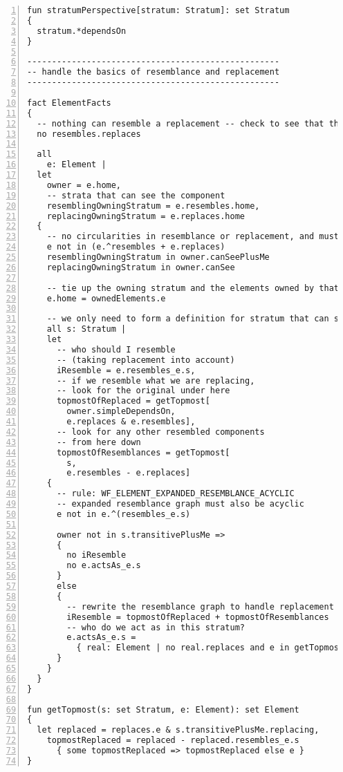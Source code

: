 \begin{lstlisting}[caption={base\_facts.als}, numbers=left]
fun stratumPerspective[stratum: Stratum]: set Stratum
{
  stratum.*dependsOn
}

---------------------------------------------------
-- handle the basics of resemblance and replacement
---------------------------------------------------

fact ElementFacts
{
  -- nothing can resemble a replacement -- check to see that the things we resemble don't replace also
  no resembles.replaces
  
  all
    e: Element |
  let
    owner = e.home,
    -- strata that can see the component
    resemblingOwningStratum = e.resembles.home,
    replacingOwningStratum = e.replaces.home
  {
    -- no circularities in resemblance or replacement, and must be visible
    e not in (e.^resembles + e.replaces)
    resemblingOwningStratum in owner.canSeePlusMe
    replacingOwningStratum in owner.canSee
    
    -- tie up the owning stratum and the elements owned by that stratum
    e.home = ownedElements.e

    -- we only need to form a definition for stratum that can see us
    all s: Stratum |
    let
      -- who should I resemble
      -- (taking replacement into account)
      iResemble = e.resembles_e.s,
      -- if we resemble what we are replacing,
      -- look for the original under here
      topmostOfReplaced = getTopmost[
        owner.simpleDependsOn,
        e.replaces & e.resembles],
      -- look for any other resembled components
      -- from here down
      topmostOfResemblances = getTopmost[
        s,
        e.resembles - e.replaces]
    {
      -- rule: WF_ELEMENT_EXPANDED_RESEMBLANCE_ACYCLIC
      -- expanded resemblance graph must also be acyclic
      e not in e.^(resembles_e.s)
  
      owner not in s.transitivePlusMe =>
      {
        no iResemble
        no e.actsAs_e.s
      }  
      else
      {
        -- rewrite the resemblance graph to handle replacement
        iResemble = topmostOfReplaced + topmostOfResemblances
        -- who do we act as in this stratum?
        e.actsAs_e.s =
          { real: Element | no real.replaces and e in getTopmost[s, real] }
      }  
    }
  }
}

fun getTopmost(s: set Stratum, e: Element): set Element
{
  let replaced = replaces.e & s.transitivePlusMe.replacing,
    topmostReplaced = replaced - replaced.resembles_e.s
      { some topmostReplaced => topmostReplaced else e }
}
\end{lstlisting}
